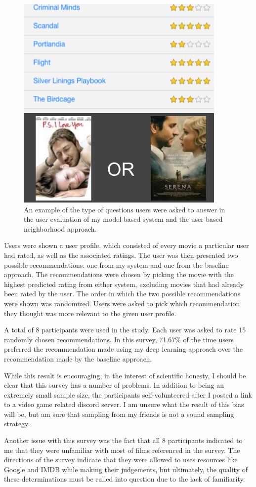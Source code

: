 \documentclass[12pt]{article}
\begin{document}
\begin{figure}
\centering
\includegraphics[width=.5\textwidth]{user}
\caption{An example of the type of questions users were asked to answer in the
user evaluation of my model-based system and the user-based neighborhood
approach.}
\end{figure}

Users were shown a user profile, which consisted of every movie a particular user
had rated, as well as the associated ratings.
The user was then presented two possible recommendations: one from my system
and one from the baseline approach.
The recommendations were chosen by picking the movie with the highest predicted
rating from either system, excluding movies that had already been rated by the
user.
The order in which the two possible recommendations were shown was randomized.
Users were asked to pick which recommendation they thought was more relevant
to the given user profile.

A total of 8 participants were used in the study.
Each user was asked to rate 15 randomly chosen recommendations.
In this survey, 71.67\% of the time users preferred the recommendation made
using my deep learning approach over the recommendation made by the baseline
approach.

While this result is encouraging, in the interest of scientific honesty, I
should be clear that this survey has a number of problems.
In addition to being an extremely small sample size,
the participants self-volunteered after I posted a link to a video
game related discord server.
I am unsure what the result of this bias will be, but am sure that sampling
from my friends is not a sound sampling strategy.

Another issue with this survey was the fact that all 8 participants indicated
to me that they were unfamiliar with most of films referenced in the survey.
The directions of the survey indicate that they were allowed to uses resources
like Google and IMDB while making their judgements, but ultimately, the
quality of these determinations must be called into question due to the lack
of familiarity.
\end{document}
